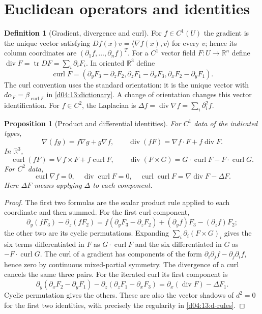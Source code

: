 \documentclass[11pt,oneside,openany]{book}
\newtheorem{proposition}[theorem]{Proposition}
\theoremstyle{definition}
\newtheorem{definition}[theorem]{Definition}
\theoremstyle{remark}
\newcommand{\R}{\mathbb R}
\newcommand{\ip}[2]{\langle#1,#2\rangle}
\DeclareMathOperator{\tr}{tr}
\newcommand{\family}[1]{}
\begin{document}
\section{Euclidean operators and identities}
\family{K04.11.01}\family{K04.11.02}\family{K04.11.03}
\begin{definition}[Gradient, divergence and curl]\label{d04:11:operators}
For $f\in C^1(U)$ the gradient is the unique vector satisfying
$Df(x)v=\ip{\nabla f(x)}v$ for every $v$; hence its column coordinates
are $(\partial_1 f,\ldots,\partial_n f)^T$.
For a $C^1$ vector field $F:U\to\R^n$ define
$\operatorname{div}F=\tr DF=\sum_i\partial_iF_i$.
In oriented $\R^3$ define
\[
 \operatorname{curl}F=(\partial_yF_3-\partial_zF_2,
 \partial_zF_1-\partial_xF_3,\partial_xF_2-\partial_yF_1).
\]
The curl convention uses the standard orientation: it is the unique vector
with $d\alpha_F=\beta_{\operatorname{curl}F}$ in
\cref{d04:13:dictionary}. A change of orientation changes this vector
identification. For $f\in C^2$, the Laplacian is
$\Delta f=\operatorname{div}\nabla f=\sum_i\partial_i^2f$.
\end{definition}

\family{K04.11.04}\family{K04.11.05}
\begin{proposition}[Product and differential identities]\label{d04:11:identities}
For $C^1$ data of the indicated types,
\[
 \nabla(fg)=f\nabla g+g\nabla f,\qquad
 \operatorname{div}(fF)=\nabla f\cdot F+f\operatorname{div}F.
\]
In $\R^3$,
\[
 \operatorname{curl}(fF)=\nabla f\times F+f\operatorname{curl}F,
 \qquad\operatorname{div}(F\times G)=G\cdot\operatorname{curl}F-F\cdot\operatorname{curl}G.
\]
For $C^2$ data,
\[
 \operatorname{curl}\nabla f=0,\quad
 \operatorname{div}\operatorname{curl}F=0,\quad
 \operatorname{curl}\operatorname{curl}F
 =\nabla\operatorname{div}F-\Delta F.
\]
Here $\Delta F$ means applying $\Delta$ to each component.
\end{proposition}
\begin{proof}
The first two formulas are the scalar product rule applied to each
coordinate and then summed. For the first curl component,
\[
 \partial_y(fF_3)-\partial_z(fF_2)
 =f(\partial_yF_3-\partial_zF_2)+(\partial_yf)F_3-(\partial_zf)F_2;
\]
the other two are its cyclic permutations. Expanding
$\sum_i\partial_i(F\times G)_i$ gives the six terms differentiated in $F$
as $G\cdot\operatorname{curl}F$ and the six differentiated in $G$ as
$-F\cdot\operatorname{curl}G$.
The curl of a gradient has components of the form
$\partial_i\partial_jf-\partial_j\partial_if$, hence zero by continuous
mixed-partial symmetry. The divergence of a curl cancels the same three
pairs. For the iterated curl its first component is
\[
 \partial_y(\partial_xF_2-\partial_yF_1)
 -\partial_z(\partial_zF_1-\partial_xF_3)
 =\partial_x(\operatorname{div}F)-\Delta F_1.
\]
Cyclic permutation gives the others. These are also the vector shadows
of $d^2=0$ for the first two identities, with precisely the regularity in
\cref{d04:13:d-rules}.
\end{proof}
\end{document}

